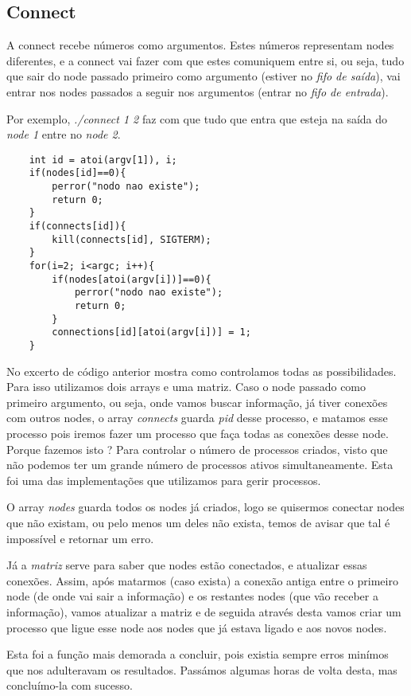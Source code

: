 \documentclass{article}
\begin{document}
\subsection{Connect}
\par A connect recebe números como argumentos. Estes números representam nodes diferentes, e a connect vai fazer com que estes comuniquem entre si, ou seja, tudo que sair do node passado primeiro como argumento (estiver no \emph{fifo de saída}), vai entrar nos nodes passados a seguir nos argumentos (entrar no \emph{fifo de entrada}).
\par Por exemplo, \emph{./connect 1 2} faz com que tudo que entra que esteja na saída do \emph{node 1} entre no \emph{node 2}.
\begin{lstlisting}
	int id = atoi(argv[1]), i;
	if(nodes[id]==0){
		perror("nodo nao existe");
		return 0;
	}
	if(connects[id]){
		kill(connects[id], SIGTERM);
	}
	for(i=2; i<argc; i++){
		if(nodes[atoi(argv[i])]==0){
			perror("nodo nao existe");
			return 0;
		}
		connections[id][atoi(argv[i])] = 1;
	}
\end{lstlisting}
\par No excerto de código anterior mostra como controlamos todas as possibilidades. Para isso utilizamos dois arrays e uma matriz. Caso o node passado como primeiro argumento, ou seja, onde vamos buscar informação, já tiver conexões com outros nodes, o array \emph{connects} guarda  \emph{pid} desse processo, e matamos esse processo pois iremos fazer um processo que faça todas as conexões desse node. Porque fazemos isto ? Para controlar o número de processos criados, visto que não podemos ter um grande número de processos ativos simultaneamente. Esta foi uma das implementações que utilizamos para gerir processos.
\par O array \emph{nodes} guarda todos os nodes já criados, logo se quisermos conectar nodes que não existam, ou pelo menos um deles não exista, temos de avisar que tal é impossível e retornar um erro.
\par Já a \emph{matriz} serve para saber que nodes estão conectados, e atualizar essas conexões. Assim, após matarmos (caso exista) a conexão antiga entre o primeiro node (de onde vai sair a informação) e os restantes nodes (que vão receber a informação), vamos atualizar a matriz e de seguida através desta vamos criar um processo que ligue esse node aos nodes que já estava ligado e aos novos nodes.
\par Esta foi a função mais demorada a concluir, pois existia sempre erros minímos que nos adulteravam os resultados. Passámos algumas horas de volta desta, mas concluímo-la com sucesso.
\end{document}
